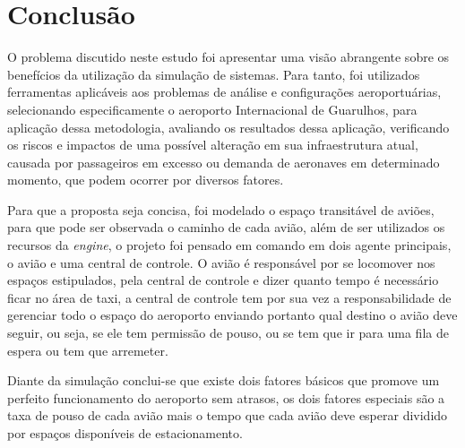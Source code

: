 \documentclass[12pt]{article}
\begin{document}
  
  
  \section{Conclusão}
  
  O problema discutido neste estudo foi apresentar uma visão abrangente 
  sobre os benefícios da utilização da simulação de sistemas. Para tanto, foi 
  utilizados ferramentas aplicáveis aos problemas de análise e configurações 
  aeroportuárias, selecionando especificamente o aeroporto Internacional de
  Guarulhos, para aplicação dessa metodologia, avaliando os resultados dessa
  aplicação, verificando os riscos e impactos de uma possível alteração em
  sua infraestrutura atual, causada por passageiros em excesso ou demanda de 
  aeronaves em determinado momento, que podem ocorrer por diversos fatores.
  
  Para que a proposta seja concisa, foi modelado o espaço transitável de aviões, 
  para que pode ser observada o caminho de cada avião, além de ser utilizados os
  recursos da \textit{engine}, o projeto foi pensado em comando em dois agente principais,
  o avião e uma central de controle. O avião é responsável por se locomover nos espaços estipulados, 
  pela central de controle e dizer quanto tempo é necessário ficar no área de taxi, a central
  de controle tem por sua vez a responsabilidade de gerenciar todo o espaço do aeroporto enviando
  portanto qual destino o avião deve seguir, ou seja, se ele tem permissão de pouso, ou se tem
  que ir para uma fila de espera ou tem que arremeter.
  
  Diante da simulação conclui-se que existe dois fatores básicos que promove um perfeito
  funcionamento do aeroporto sem atrasos, os dois fatores especiais são a taxa de pouso 
  de cada avião mais o tempo que cada avião deve esperar dividido por espaços disponíveis
  de estacionamento. 
  
  
  
  
  
\end{document}
